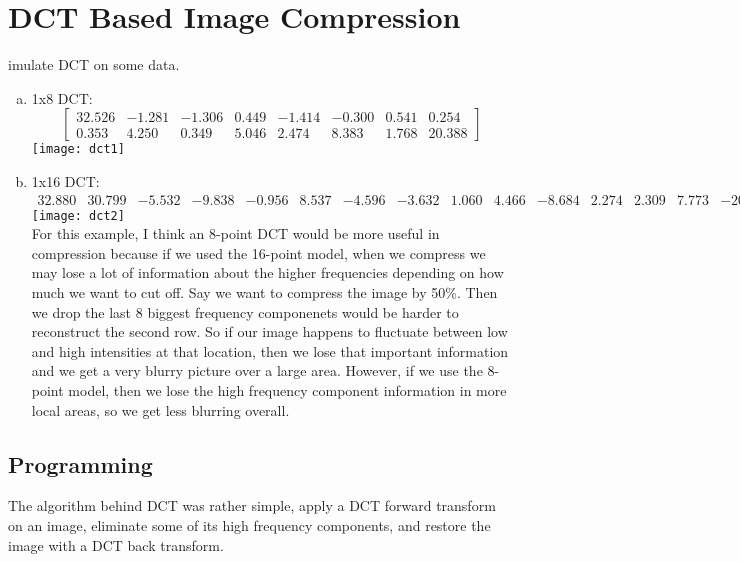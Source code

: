 \documentclass[12pt]{article}
\newenvironment{question}[2][Question]{\begin{trivlist}
\item[\hskip \labelsep{\bfseries #1}\hskip \labelsep{\bfseries #2.}]}{\end{trivlist}}
\begin{document}
\section{DCT Based Image Compression}

\setcounter{MaxMatrixCols}{20}
\begin{question}[1]
Simulate DCT on some data.
\begin{enumerate}[(a)]
  \item 1x8 DCT: \[
\begin{bmatrix}
 32.526 &
 -1.281&  
 -1.306&
  0.449&
 -1.414&
 -0.300&
  0.541&
  0.254\\
 0.353 & 
 4.250 &
 0.349 &
 5.046 &
 2.474 &
 8.383 &
 1.768 &
20.388

\end{bmatrix}
\]
\texttt{[image: dct1]}\\
\item 1x16 DCT:
\[
\begin{smallmatrix}
 32.880 & 
 30.799 &
 -5.532 &
 -9.838 &
 -0.956 &
  8.537 &
 -4.596 &
 -3.632 &
  1.060 &
  4.466 &
 -8.684 &
  2.274 &
  2.309 &
  7.773 &
-20.133 &
 19.182

\end{smallmatrix}
\]
\texttt{[image: dct2]}\\
For this example, I think an 8-point DCT would be more useful in compression
because if we used the 16-point model, when we compress we may lose a lot of
information about the higher frequencies depending on how much we want to cut off. Say we
want to compress the image by 50\%. Then we drop the last 8 biggest frequency componenets
would be harder to reconstruct the second row. So if our image happens to
fluctuate between low and high intensities at that location, then we lose that
important information and we get a very blurry picture over a large area.
However, if we use the 8-point model, then we lose the high frequency component
information in more local areas, so we get less blurring overall.
\end{enumerate}
\end{question}

\subsection{Programming}

The algorithm behind DCT was rather simple, apply a DCT forward transform on an
image, eliminate some of its high frequency components, and restore the image
with a DCT back transform.
\end{document}
